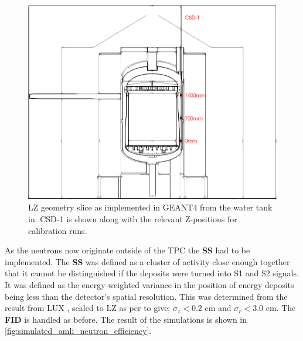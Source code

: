 \begin{figure}[]
\centering
\includegraphics[width=\textwidth]{Figures/Geometry/csd1_geometry_black_and_white.png}
\caption{LZ geometry slice as implemented in GEANT4 from the water tank in. CSD-1 is shown along with the relevant Z-positions for calibration runs.}
\label{fig:CSD1_Geometry}
\end{figure}


\par
As the neutrons now originate outside of the TPC the \textbf{SS} had to be implemented.
The \textbf{SS} was defined as a cluster of activity close enough together that it cannot be distinguished if the deposits were turned into S1 and S2 signals.
It was defined as the energy-weighted variance in the position of energy deposits being less than the detector's spatial resolution.
This was determined from the result from LUX \cite{lux_position_reconstruction_ref}, scaled to LZ as per \cite{LZ_TechnicalDesignReview_ref} to give; ${\sigma}_{z}<0.2$ cm and ${\sigma}_{r}<3.0$ cm.
The \textbf{FID} is handled as before.
The result of the simulations is shown in \autoref{fig:simulated_amli_neutron_efficiency}.



